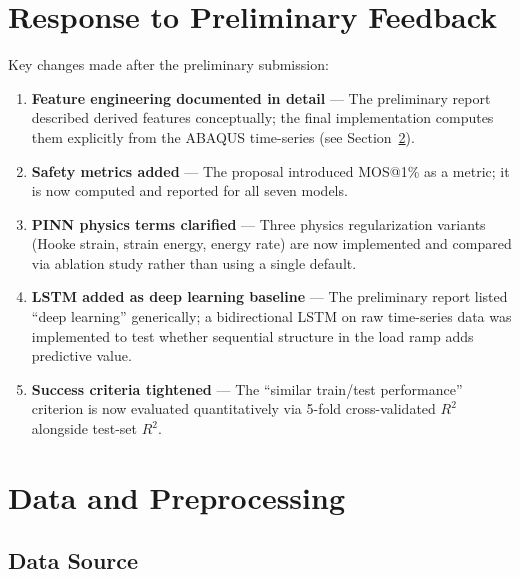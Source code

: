 \documentclass[10pt,letterpaper]{article}
\newcommand{\Rsq}{R^2}
\begin{document}
\section{Response to Preliminary Feedback}

Key changes made after the preliminary submission:

\begin{enumerate}
  \item \textbf{Feature engineering documented in detail} --- The preliminary report described
    derived features conceptually; the final implementation computes them explicitly from the
    ABAQUS time-series (see Section~\ref{sec:data}).
  \item \textbf{Safety metrics added} --- The proposal introduced MOS@1\% as a metric; it is
    now computed and reported for all seven models.
  \item \textbf{PINN physics terms clarified} --- Three physics regularization variants
    (Hooke strain, strain energy, energy rate) are now implemented and compared via ablation
    study rather than using a single default.
  \item \textbf{LSTM added as deep learning baseline} --- The preliminary report listed ``deep
    learning'' generically; a bidirectional LSTM on raw time-series data was implemented to
    test whether sequential structure in the load ramp adds predictive value.
  \item \textbf{Success criteria tightened} --- The ``similar train/test performance'' criterion
    is now evaluated quantitatively via 5-fold cross-validated $\Rsq$ alongside test-set $\Rsq$.
\end{enumerate}

\section{Data and Preprocessing}
\label{sec:data}

\subsection{Data Source}
\end{document}
